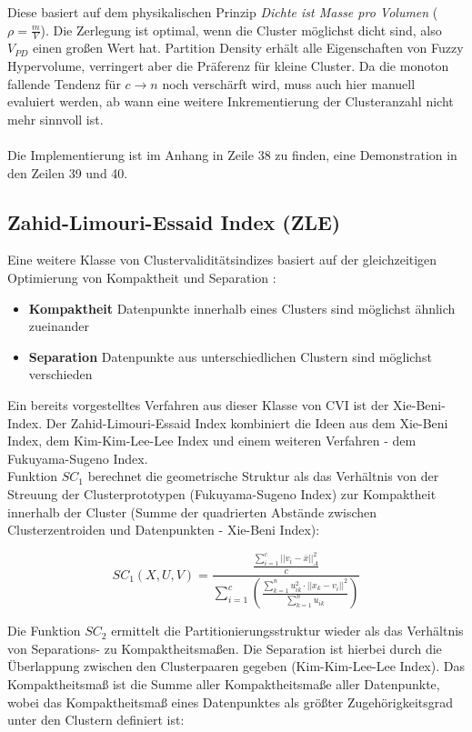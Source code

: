 \documentclass[11pt,ceqn]{book}
\begin{document}
Diese basiert auf dem physikalischen Prinzip \textit{Dichte ist Masse pro Volumen} ($\rho = \frac{m}{V}$). Die Zerlegung ist optimal, wenn die Cluster möglichst dicht sind, also $V_{PD}$ einen großen Wert hat. Partition Density erhält alle Eigenschaften von Fuzzy Hypervolume, verringert aber die Präferenz für kleine Cluster. Da die monoton fallende Tendenz für $c \rightarrow n$ noch verschärft wird, muss auch hier manuell evaluiert werden, ab wann eine weitere Inkrementierung der Clusteranzahl nicht mehr sinnvoll ist.
\\~\\
Die Implementierung ist im Anhang in Zeile 38 zu finden, eine Demonstration in den Zeilen 39 und 40.

\subsection{Zahid-Limouri-Essaid Index (ZLE)}
Eine weitere Klasse von Clustervaliditätsindizes basiert auf der gleichzeitigen Optimierung von Kompaktheit und Separation \cite{zle}:
\begin{itemize}
\item \textbf{Kompaktheit} Datenpunkte innerhalb eines Clusters sind möglichst ähnlich zueinander
\item \textbf{Separation} Datenpunkte aus unterschiedlichen Clustern sind möglichst verschieden
\end{itemize}

Ein bereits vorgestelltes Verfahren aus dieser Klasse von CVI ist der Xie-Beni-Index. Der Zahid-Limouri-Essaid Index kombiniert die Ideen aus dem Xie-Beni Index, dem Kim-Kim-Lee-Lee Index und einem weiteren Verfahren - dem Fukuyama-Sugeno Index. \\

Funktion $SC_1$ berechnet die geometrische Struktur als das Verhältnis von der Streuung der Clusterprototypen (Fukuyama-Sugeno Index) zur Kompaktheit innerhalb der Cluster (Summe der quadrierten Abstände zwischen Clusterzentroiden und Datenpunkten - Xie-Beni Index):

$$SC_1(X,U,V) = \frac{\frac{\sum\limits_{i=1}^c ||v_i-\overline{x}||_A^2}{c}}{\sum\limits_{i=1}^c\left(\frac{\sum\limits_{k=1}^n u_{ik}^2 \cdot ||x_k-v_i||^2}{\sum\limits_{k=1}^n u_{ik}}\right)}$$

Die Funktion $SC_2$ ermittelt die Partitionierungsstruktur wieder als das Verhältnis von Separations- zu Kompaktheitsmaßen. Die Separation ist hierbei durch die Überlappung zwischen den Clusterpaaren gegeben (Kim-Kim-Lee-Lee Index). Das Kompaktheitsmaß ist die Summe aller Kompaktheitsmaße aller Datenpunkte, wobei das Kompaktheitsmaß eines Datenpunktes als größter Zugehörigkeitsgrad unter den Clustern definiert ist: 
\end{document}
